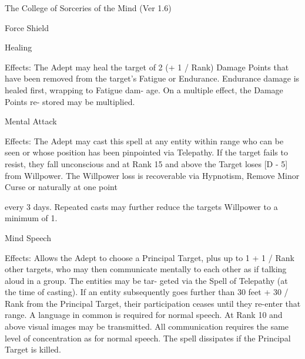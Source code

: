 \begin{Chapter}{The College of Sorceries of the Mind (Ver 1.6)}
\begin{spell}[S-2]{Force Shield }
\end{spell}

\begin{spell}[S-3]{Healing }

Effects:  The  Adept  may  heal  the target  of  2  (+ 1 / 
Rank)  Damage  Points  that  have  been  removed 
from the target’s Fatigue or Endurance. Endurance 
damage  is  healed  first,  wrapping  to  Fatigue  dam-
age.  On  a  multiple  effect,  the  Damage  Points  re-
stored may be multiplied. 

\end{spell}

\begin{spell}[S-4]{Mental Attack }

Effects: The Adept may cast this spell at any entity 
within  range  who  can  be  seen  or  whose  position 
has  been  pinpointed  via  Telepathy.  If  the  target 
fails to resist, they fall unconscious and at Rank 15 
and above the Target loses [D - 5] from Willpower. 
The Willpower  loss is  recoverable  via  Hypnotism, 
Remove  Minor  Curse  or  naturally  at  one  point 

every  3  days.  Repeated  casts  may  further  reduce 
the targets Willpower to a minimum of 1. 

\end{spell}

\begin{spell}[S-5]{Mind Speech }

Effects:  Allows  the  Adept  to  choose  a  Principal 
Target,  plus up  to  1  + 1  /  Rank  other  targets,  who 
may then communicate mentally to each other as if 
talking  aloud  in  a  group.  The  entities  may  be  tar-
geted  via  the  Spell  of  Telepathy  (at  the  time  of 
casting). If an entity subsequently goes further than 
30 feet + 30 / Rank from the Principal Target, their 
participation  ceases  until  they  re-enter  that  range. 
A  language  in  common  is  required  for  normal 
speech.  At  Rank  10  and  above  visual  images  may 
be  transmitted.  All  communication  requires  the 
same  level  of  concentration  as  for  normal  speech. 
The spell dissipates if the Principal Target is killed. 


\end{spell}
\end{Chapter}
